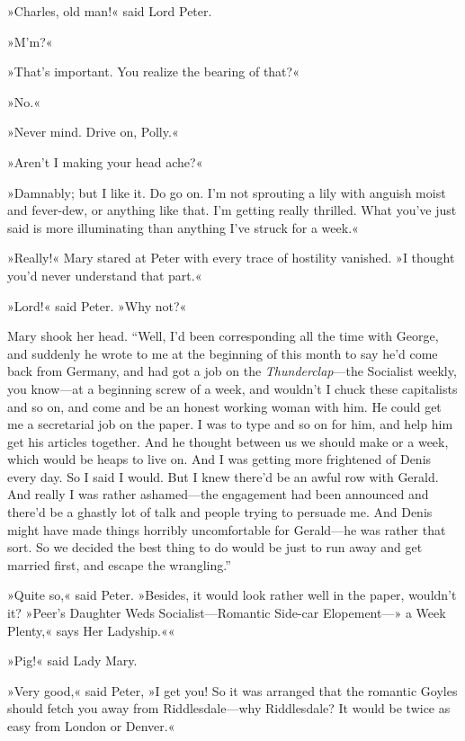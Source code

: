 »Charles, old man!« said Lord Peter.

»M'm?«

»That's important. You realize the bearing of that?«

»No.«

»Never mind. Drive on, Polly.«

»Aren't I making your head ache?«

»Damnably; but I like it. Do go on. I'm not sprouting a lily with anguish moist and fever-dew, or anything like that. I'm getting really thrilled. What you've just said is more illuminating than anything I've struck for a week.«

»Really!« Mary stared at Peter with every trace of hostility vanished.  »I thought you'd never understand that part.«

»Lord!« said Peter. »Why not?«

Mary shook her head. \enquote{Well, I'd been corresponding all the time with George, and suddenly he wrote to me at the beginning of this month to say he'd come back from Germany, and had got a job on the \textit{Thunderclap}---the Socialist weekly, you know\allowbreak---\allowbreak at a beginning screw of  a week, and wouldn't I chuck these capitalists and so on, and come and be an honest working woman with him. He could get me a secretarial job on the paper. I was to type and so on for him, and help him get his articles together. And he thought between us we should make  or  a week, which would be heaps to live on. And I was getting more frightened of Denis every day. So I said I would. But I knew there'd be an awful row with Gerald. And really I was rather ashamed\allowbreak---\allowbreak the engagement had been announced and there'd be a ghastly lot of talk and people trying to persuade me. And Denis might have made things horribly uncomfortable for Gerald\allowbreak---\allowbreak he was rather that sort. So we decided the best thing to do would be just to run away and get married first, and escape the wrangling.}

»Quite so,« said Peter. »Besides, it would look rather well in the paper, wouldn't it? »Peer's Daughter Weds Socialist\allowbreak---\allowbreak Romantic Side-car Elopement---» a Week Plenty,« says Her Ladyship.««

»Pig!« said Lady Mary.

»Very good,« said Peter, »I get you! So it was arranged that the romantic Goyles should fetch you away from Riddlesdale\allowbreak---\allowbreak why Riddlesdale? It would be twice as easy from London or Denver.«

